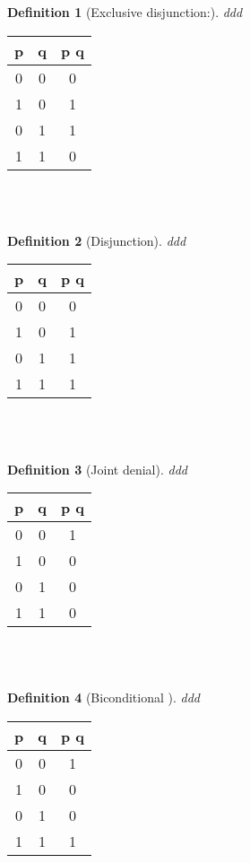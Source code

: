 \documentclass[10pt,a4paper,draft,titlepage,onecolumn]{book}
\newtheorem{definition}{Definition}[section]
\begin{document}
\begin{definition}[Exclusive disjunction:]ddd
\end{definition}
\begin{tabular}{ |c|c|c| }
 \hline
 p & q &  p  q  \\
 \hline
 0 & 0 & 0 \\
 1 & 0 & 1\\
 0 & 1 & 1\\
 1 & 1 & 0\\
 \hline
\end{tabular}\\\\

\begin{definition}[Disjunction]ddd
\end{definition}
\begin{tabular}{ |c|c|c| }
 \hline
 p & q &  p  q  \\
 \hline
 0 & 0 & 0 \\
 1 & 0 & 1\\
 0 & 1 & 1\\
 1 & 1 & 1\\
 \hline
\end{tabular}\\\\


\begin{definition}[Joint denial]ddd
\end{definition}
\begin{tabular}{ |c|c|c| }
 \hline
 p & q &  p  q  \\
 \hline
 0 & 0 & 1 \\
 1 & 0 & 0\\
 0 & 1 & 0\\
 1 & 1 & 0\\
 \hline
\end{tabular}\\\\


\begin{definition}[Biconditional ]ddd
\end{definition}
\begin{tabular}{ |c|c|c| }
 \hline
 p & q &  p  q  \\
 \hline
 0 & 0 & 1 \\
 1 & 0 & 0\\
 0 & 1 & 0\\
 1 & 1 & 1\\
 \hline
\end{tabular}\\\\
\end{document}
